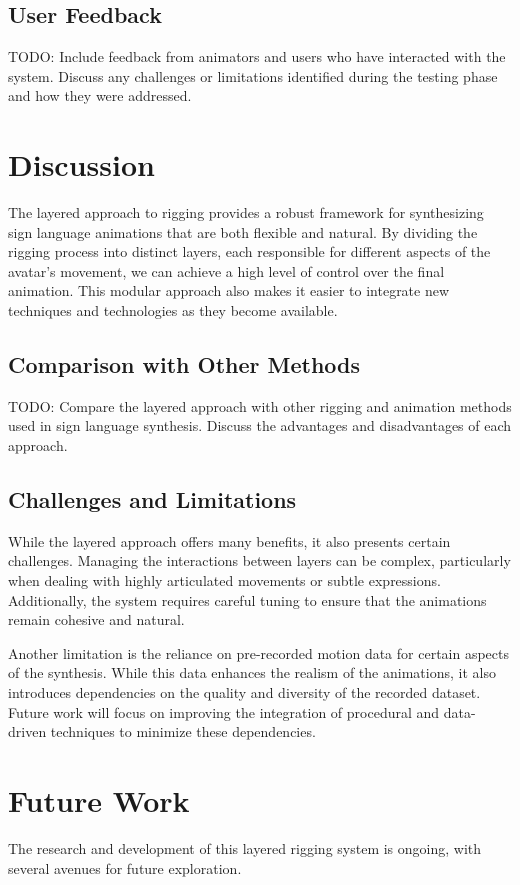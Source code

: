 \documentclass[../../main.tex]{subfiles}
\begin{document}
\subsection{User Feedback}
TODO: Include feedback from animators and users who have interacted with the system. Discuss any challenges or limitations identified during the testing phase and how they were addressed.

\section{Discussion}
The layered approach to rigging provides a robust framework for synthesizing sign language animations that are both flexible and natural. By dividing the rigging process into distinct layers, each responsible for different aspects of the avatar's movement, we can achieve a high level of control over the final animation. This modular approach also makes it easier to integrate new techniques and technologies as they become available.

\subsection{Comparison with Other Methods}
TODO: Compare the layered approach with other rigging and animation methods used in sign language synthesis. Discuss the advantages and disadvantages of each approach.

\subsection{Challenges and Limitations}
While the layered approach offers many benefits, it also presents certain challenges. Managing the interactions between layers can be complex, particularly when dealing with highly articulated movements or subtle expressions. Additionally, the system requires careful tuning to ensure that the animations remain cohesive and natural.

Another limitation is the reliance on pre-recorded motion data for certain aspects of the synthesis. While this data enhances the realism of the animations, it also introduces dependencies on the quality and diversity of the recorded dataset. Future work will focus on improving the integration of procedural and data-driven techniques to minimize these dependencies.

\section{Future Work}
The research and development of this layered rigging system is ongoing, with several avenues for future exploration.
\end{document}
